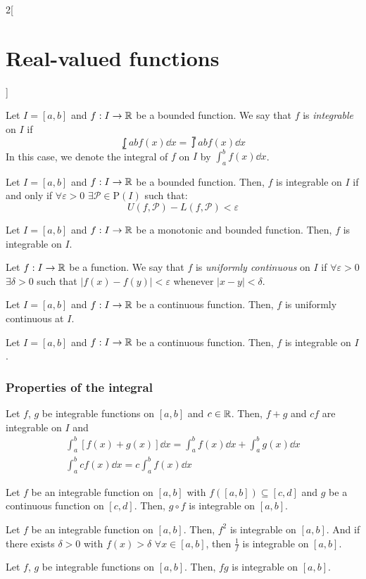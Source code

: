 \documentclass[../../../main.tex]{subfiles}
\begin{document}
\begin{multicols}{2}[\section{Real-valued functions}]
\begin{definition}
  \end{definition}
  \begin{definition}\label{RVF_integrable}
    Let $I=[a,b]$ and $f:I\rightarrow\mathbb{R}$ be a bounded function. We say that $f$ is \emph{integrable} on $I$ if $$\lowint{a}{b}f(x)\dd{x}=\upint{a}{b}f(x)\dd{x}$$ In this case, we denote the integral of $f$ on $I$ by $\displaystyle\int_a^b f(x)\dd{x}$.
  \end{definition}
  \begin{lemma}
    Let $I=[a,b]$ and $f:I\rightarrow\mathbb{R}$ be a bounded function. Then, $f$ is integrable on $I$ if and only if $\forall\varepsilon>0$ $\exists\mathcal{P}\in\mathrm{P}(I)$ such that: $$U(f,\mathcal{P})-L(f,\mathcal{P})<\varepsilon$$
  \end{lemma}
  \begin{theorem}
    Let $I=[a,b]$ and $f:I\rightarrow\mathbb{R}$ be a monotonic and bounded function. Then, $f$ is integrable on $I$.
  \end{theorem}
  \begin{definition}
    Let $f:I\rightarrow\mathbb{R}$ be a function. We say that $f$ is \emph{uniformly continuous} on $I$ if $\forall\varepsilon>0$ $\exists\delta>0$ such that $|f(x)-f(y)|<\varepsilon$ whenever $|x-y|<\delta$.
  \end{definition}
  \begin{theorem}
    Let $I=[a,b]$ and $f:I\rightarrow\mathbb{R}$ be a continuous function. Then, $f$ is uniformly continuous at $I$.
  \end{theorem}
  \begin{theorem}
    Let $I=[a,b]$ and $f:I\rightarrow\mathbb{R}$ be a continuous function. Then, $f$ is integrable on $I$.
  \end{theorem}
  \subsubsection{Properties of the integral}
  \begin{proposition}
    Let $f$, $g$ be integrable functions on $[a,b]$ and $c\in\mathbb{R}$. Then, $f+g$ and $cf$ are integrable on $I$ and
    \begin{gather*}
      \int_a^b[f(x)+g(x)]\dd{x}=\int_a^bf(x)\dd{x}+\int_a^bg(x)\dd{x}\\ \int_a^bcf(x)\dd{x}=c\int_a^bf(x)\dd{x}
    \end{gather*}
  \end{proposition}
  \begin{theorem}
    Let $f$ be an integrable function on $[a,b]$ with $f([a,b])\subseteq[c,d]$ and $g$ be a continuous function on $[c,d]$. Then, $g\circ f$ is integrable on $[a,b]$.
  \end{theorem}
  \begin{corollary}
    Let $f$ be an integrable function on $[a,b]$. Then, $f^2$ is integrable on $[a,b]$. And if there exists $\delta>0$ with $f(x)>\delta$ $\forall x\in [a,b]$, then $\frac{1}{f}$ is integrable on $[a,b]$.
  \end{corollary}
  \begin{corollary}
    Let $f$, $g$ be integrable functions on $[a,b]$. Then, $fg$ is integrable on $[a,b]$.
  \end{corollary}

\end{multicols}
\end{document}
